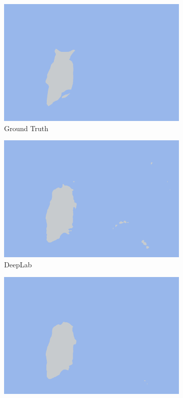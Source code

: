 \documentclass[a4paper,12pt]{ctexart}
\begin{document}
\begin{figure}[h!]
    \begin{subfigure}{0.25\textwidth}
        \centering
        \includegraphics[width=\linewidth]{figures/COD10K_demo1/COD10K_demo1_gt.png}
        \caption{Ground Truth}
    \end{subfigure}%
    \hfill
    \begin{subfigure}{0.25\textwidth}
        \centering
        \includegraphics[width=\linewidth]{figures/COD10K_demo1/COD10K_demo1_pred_ssvm.png}
        \caption{DeepLab}
    \end{subfigure}%
    \hfill
    \begin{subfigure}{0.25\textwidth}
        \centering
        \includegraphics[width=\linewidth]{figures/COD10K_demo1/COD10K_demo1_pred_crf.png}

\end{subfigure}
\end{figure}
\end{document}
